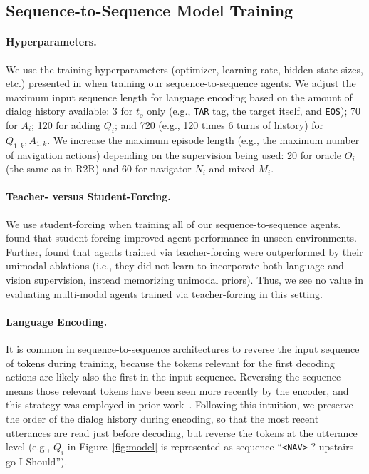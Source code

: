 \subsection{Sequence-to-Sequence Model Training}

\paragraph{Hyperparameters.}
We use the training hyperparameters (optimizer, learning rate, hidden state sizes, etc.) presented in \citet{anderson:cvpr18} when training our sequence-to-sequence agents.
We adjust the maximum input sequence length for language encoding based on the amount of dialog history available: 3 for $t_o$ only (e.g., \texttt{TAR} tag, the target itself, and \texttt{EOS}); 70 for $A_i$; 120 for adding $Q_i$; and 720 (e.g., 120 times 6 turns of history) for $Q_{1:k},A_{1:k}$.
We increase the maximum episode length (e.g., the maximum number of navigation actions) depending on the supervision being used: 20 for oracle $O_i$ (the same as in R2R) and 60 for navigator $N_i$ and mixed $M_i$.

\paragraph{Teacher- versus Student-Forcing.}
We use student-forcing when training all of our sequence-to-sequence agents.
\citet{anderson:cvpr18} found that student-forcing improved agent performance in unseen environments.
Further, \citet{thomason:naacl19} found that agents trained via teacher-forcing were outperformed by their unimodal ablations (i.e., they did not learn to incorporate both language and vision supervision, instead memorizing unimodal priors).
Thus, we see no value in evaluating multi-modal agents trained via teacher-forcing in this setting.

\paragraph{Language Encoding.}
It is common in sequence-to-sequence architectures to reverse the input sequence of tokens during training, because the tokens relevant for the first decoding actions are likely also the first in the input sequence.
Reversing the sequence means those relevant tokens have been seen more recently by the encoder, and this strategy was employed in prior work~\cite{anderson:cvpr18}.
Following this intuition, we preserve the order of the dialog history during encoding, so that the most recent utterances are read just before decoding, but reverse the tokens at the utterance level (e.g., $Q_i$ in Figure~\ref{fig:model} is represented as sequence ``\texttt{<NAV>} ? upstairs go I Should'').

